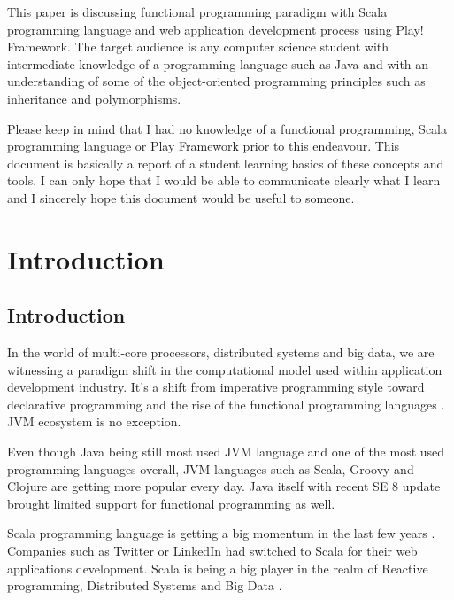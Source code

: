 \documentclass[12pt,twoside,a4paper]{report}
\begin{document}
This paper is discussing functional programming paradigm with Scala programming language and web application development process using Play! Framework. The target audience is any computer science student with intermediate knowledge of a programming language such as Java and with an understanding of some of the object-oriented programming principles such as inheritance and polymorphisms.

Please keep in mind that I had no knowledge of a functional programming, Scala programming language or Play Framework prior to this endeavour. This document is basically a report of a student learning basics of these concepts and tools. I can only hope that I would be able to communicate clearly what I learn and I sincerely hope this document would be useful to someone.

\listoffigures
\tableofcontents{}











\chapter{Introduction}\label{1}

\section{Introduction}\label{1.1}
In the world of multi-core processors, distributed systems and big data, we are witnessing a paradigm shift in the computational model used within application development industry. It's a shift from imperative programming style toward declarative programming and the rise of the functional programming languages \cite{1}. JVM ecosystem is no exception.

Even though Java being still most used JVM language and one of the most used programming languages overall, JVM languages such as Scala, Groovy and Clojure are getting more popular every day. Java itself with recent SE 8 update brought limited support for functional programming as well.

Scala programming language \cite{2} is getting a big momentum in the last few years \cite{3}. Companies such as Twitter or LinkedIn \cite{4} had switched to Scala for their web applications development. Scala is being a big player in the realm of Reactive programming, Distributed Systems and Big Data \cite{5}.
\end{document}
